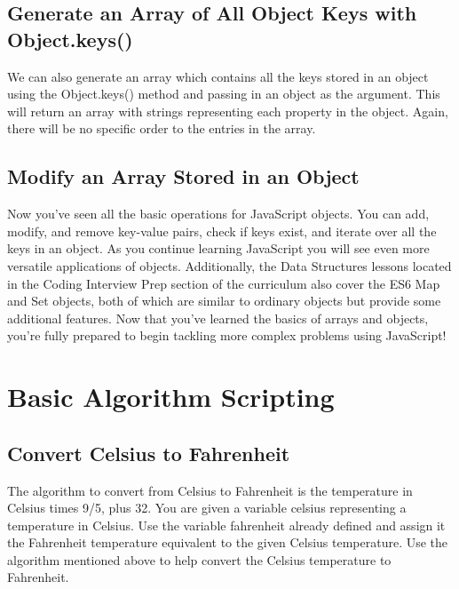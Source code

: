 \documentclass{article}%
\begin{document}
%
\subsection{Generate an Array of All Object Keys with Object.keys()}%
\label{subsec:GenerateanArrayofAllObjectKeyswithObject.keys()}%
We can also generate an array which contains all the keys stored in an object using the Object.keys() method and passing in an object as the argument. This will return an array with strings representing each property in the object. Again, there will be no specific order to the entries in the array.\newline%

%
\subsection{Modify an Array Stored in an Object}%
\label{subsec:ModifyanArrayStoredinanObject}%
Now you've seen all the basic operations for JavaScript objects. You can add, modify, and remove key{-}value pairs, check if keys exist, and iterate over all the keys in an object. As you continue learning JavaScript you will see even more versatile applications of objects. Additionally, the Data Structures lessons located in the Coding Interview Prep section of the curriculum also cover the ES6 Map and Set objects, both of which are similar to ordinary objects but provide some additional features. Now that you've learned the basics of arrays and objects, you're fully prepared to begin tackling more complex problems using JavaScript!\newline%

%
\newpage%
\section{Basic Algorithm Scripting}%
\label{sec:BasicAlgorithmScripting}%
\subsection{Convert Celsius to Fahrenheit}%
\label{subsec:ConvertCelsiustoFahrenheit}%
The algorithm to convert from Celsius to Fahrenheit is the temperature in Celsius times 9/5, plus 32.\newline%
You are given a variable celsius representing a temperature in Celsius. Use the variable fahrenheit already defined and assign it the Fahrenheit temperature equivalent to the given Celsius temperature. Use the algorithm mentioned above to help convert the Celsius temperature to Fahrenheit.\newline%
\end{document}

